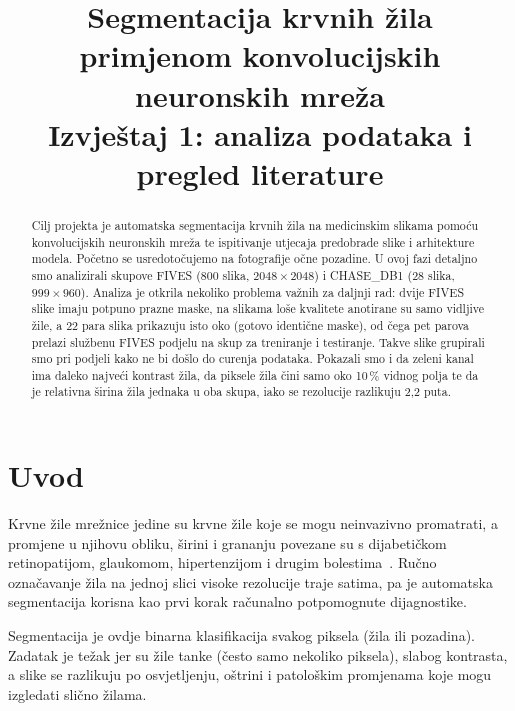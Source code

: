 \documentclass[conference]{IEEEtran}
\begin{document}
\title{Segmentacija krvnih žila primjenom konvolucijskih neuronskih mreža\\
\large Izvještaj 1: analiza podataka i pregled literature}

\author{
}

\maketitle

\begin{abstract}
Cilj projekta je automatska segmentacija krvnih žila na medicinskim slikama pomoću konvolucijskih neuronskih mreža te ispitivanje utjecaja predobrade slike i arhitekture modela. Početno se usredotočujemo na fotografije očne pozadine. U ovoj fazi detaljno smo analizirali skupove FIVES (800 slika, $2048\times2048$) i CHASE\_DB1 (28 slika, $999\times960$). Analiza je otkrila nekoliko problema važnih za daljnji rad: dvije FIVES slike imaju potpuno prazne maske, na slikama loše kvalitete anotirane su samo vidljive žile, a 22 para slika prikazuju isto oko (gotovo identične maske), od čega pet parova prelazi službenu FIVES podjelu na skup za treniranje i testiranje. Takve slike grupirali smo pri podjeli kako ne bi došlo do curenja podataka. Pokazali smo i da zeleni kanal ima daleko najveći kontrast žila, da piksele žila čini samo oko 10\,\% vidnog polja te da je relativna širina žila jednaka u oba skupa, iako se rezolucije razlikuju 2,2 puta.
\end{abstract}

\section{Uvod}
Krvne žile mrežnice jedine su krvne žile koje se mogu neinvazivno promatrati, a promjene u njihovu obliku, širini i grananju povezane su s dijabetičkom retinopatijom, glaukomom, hipertenzijom i drugim bolestima~\cite{fraz2012survey}. Ručno označavanje žila na jednoj slici visoke rezolucije traje satima, pa je automatska segmentacija korisna kao prvi korak računalno potpomognute dijagnostike.

Segmentacija je ovdje binarna klasifikacija svakog piksela (žila ili pozadina). Zadatak je težak jer su žile tanke (često samo nekoliko piksela), slabog kontrasta, a slike se razlikuju po osvjetljenju, oštrini i patološkim promjenama koje mogu izgledati slično žilama.
\end{document}
